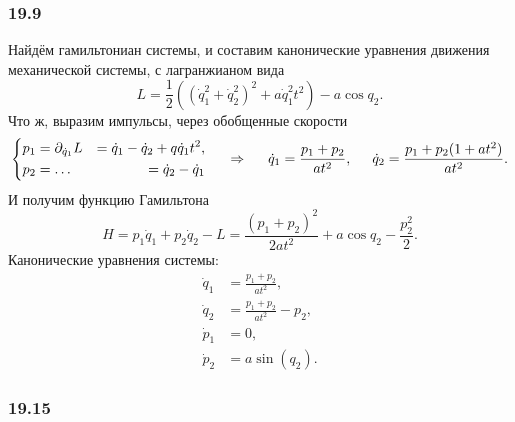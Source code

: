 \subsubsection*{19.9}

Найдём гамильтониан системы, и составим канонические уравнения движения механической системы, с лагранжианом вида
\begin{equation*}
    L = \frac{1}{2} \left(
        (\dot{q}_1^2 + \dot{q}_2^2)^2 + a \dot{q}_1^2 t^2
    \right) - a \cos q_2.
\end{equation*}
Что ж, выразим импульсы, через обобщенные скорости
\begin{equation*}
    \left\{\begin{aligned}
        p_1 &= \partial_{\dot{q}_1} L &= \dot{q}_1 - \dot{q}_2 + q \dot{q}_1 t^2, \\
        p_2 &= \ldots &= \dot{q}_2 - \dot{q}_1
    \end{aligned}\right.
    \hspace{0.5cm} \Rightarrow \hspace{0.5cm}
    \dot{q}_1 = \frac{p_1+p_2}{at^2},
    \hspace{5 mm} 
    \dot{q}_2 = \frac{p_1 + p_2(1+at^2)}{at^2}.
\end{equation*}
И получим функцию Гамильтона
\begin{equation*}
    H = p_1 \dot{q}_1 + p_2 \dot{q}_2 - L = 
    \frac{(p_1+p_2)^2}{2 at^2} + a \cos q_2 - \frac{p_2^2}{2}.
\end{equation*}
Канонические уравнения системы:
\begin{align*}
    \dot{q}_1 &= \frac{p_1+p_2}{a t^2}, \\
    \dot{q}_2 &= \frac{p_1+p_2}{a t^2}-p_2, \\
    \dot{p}_1 &= 0, \\
    \dot{p}_2 &= a \sin (q_2) .
\end{align*}




\subsubsection*{19.15}

